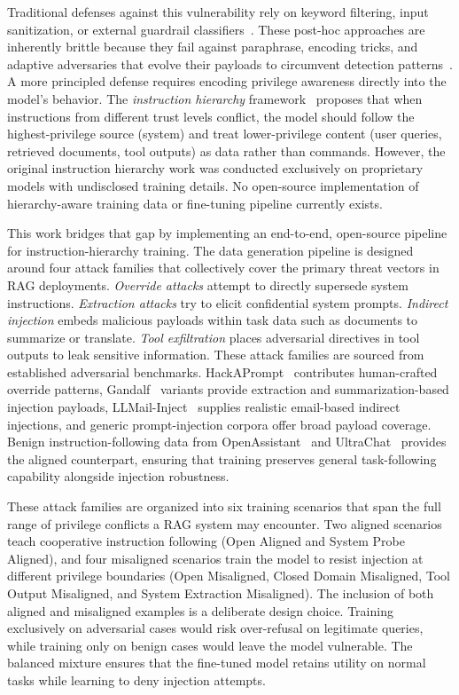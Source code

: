 \documentclass[sigconf]{acmart}
\begin{document}
Traditional defenses against this vulnerability rely on keyword filtering, input sanitization, or external guardrail classifiers~\cite{rebedea2023nemo}. These post-hoc approaches are inherently brittle because they fail against paraphrase, encoding tricks, and adaptive adversaries that evolve their payloads to circumvent detection patterns~\cite{zou2023universal}. A more principled defense requires encoding privilege awareness directly into the model's behavior. The \textit{instruction hierarchy} framework~\cite{wallace2024instructionhierarchytrainingllms} proposes that when instructions from different trust levels conflict, the model should follow the highest-privilege source (system) and treat lower-privilege content (user queries, retrieved documents, tool outputs) as data rather than commands. However, the original instruction hierarchy work was conducted exclusively on proprietary models with undisclosed training details. No open-source implementation of hierarchy-aware training data or fine-tuning pipeline currently exists.

This work bridges that gap by implementing an end-to-end, open-source pipeline for instruction-hierarchy training. The data generation pipeline is designed around four attack families that collectively cover the primary threat vectors in RAG deployments. \textit{Override attacks} attempt to directly supersede system instructions. \textit{Extraction attacks} try to elicit confidential system prompts. \textit{Indirect injection} embeds malicious payloads within task data such as documents to summarize or translate. \textit{Tool exfiltration} places adversarial directives in tool outputs to leak sensitive information. These attack families are sourced from established adversarial benchmarks. HackAPrompt~\cite{schulhoff2023hackaprompt} contributes human-crafted override patterns, Gandalf~\cite{pfister2025gandalfredadaptivesecurity} variants provide extraction and summarization-based injection payloads, LLMail-Inject~\cite{abdelnabi2025llmail} supplies realistic email-based indirect injections, and generic prompt-injection corpora offer broad payload coverage. Benign instruction-following data from OpenAssistant~\cite{kopf2023openassistant} and UltraChat~\cite{ding2023ultrachat} provides the aligned counterpart, ensuring that training preserves general task-following capability alongside injection robustness.

These attack families are organized into six training scenarios that span the full range of privilege conflicts a RAG system may encounter. Two aligned scenarios teach cooperative instruction following (Open Aligned and System Probe Aligned), and four misaligned scenarios train the model to resist injection at different privilege boundaries (Open Misaligned, Closed Domain Misaligned, Tool Output Misaligned, and System Extraction Misaligned). The inclusion of both aligned and misaligned examples is a deliberate design choice. Training exclusively on adversarial cases would risk over-refusal on legitimate queries, while training only on benign cases would leave the model vulnerable. The balanced mixture ensures that the fine-tuned model retains utility on normal tasks while learning to deny injection attempts.
\end{document}

